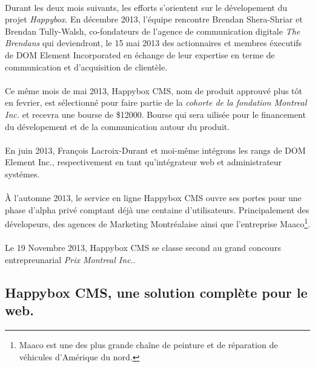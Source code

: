 \documentclass[11pt, a4paper ]{report}
\begin{document}
\paragraph{}
Durant les deux mois suivants, les efforts s'orientent sur le dévelopement du projet \emph{Happybox}. 
En décembre 2013, l'équipe rencontre Brendan Shera-Shriar et Brendan Tully-Walsh, co-fondateurs de l'agence de communication digitale \emph{The Brendans} qui deviendront, le 15 mai 2013 des actionnaires et membres éxecutifs de DOM Element Incorporated en échange de leur expertise en terme de communication et d'acquisition de clientèle.
\paragraph{}
Ce même mois de mai 2013, Happybox CMS, nom de produit approuvé plus tôt en fevrier, est sélectionné pour faire partie de la \emph{cohorte de la fondation Montreal Inc.} et recevra une bourse de \$12000. Bourse qui sera uilisée pour le financement du dévelopement et de la communication autour du produit.
\paragraph{}
En juin 2013, François Lacroix-Durant et moi-même intégrons les rangs de DOM Element Inc., respectivement en tant qu'intégrateur web et administrateur systémes.
\paragraph{}
À l'automne 2013, le service en ligne Happybox CMS ouvre ses portes pour une phase d'alpha privé comptant déjà une centaine d'utilisateurs. Principalement des dévelopeurs, des agences de Marketing Montréalaise ainsi que l'entreprise Maaco\footnote{Maaco est une des plus grande chaîne de peinture et de réparation de véhicules d'Amérique du nord.}.
\paragraph{}
Le 19 Novembre 2013, Happybox CMS se classe second au grand concours entrepreunarial \emph{Prix Montreal Inc}..


			\subsection{Happybox CMS, une solution complète pour le web.}
\end{document}
